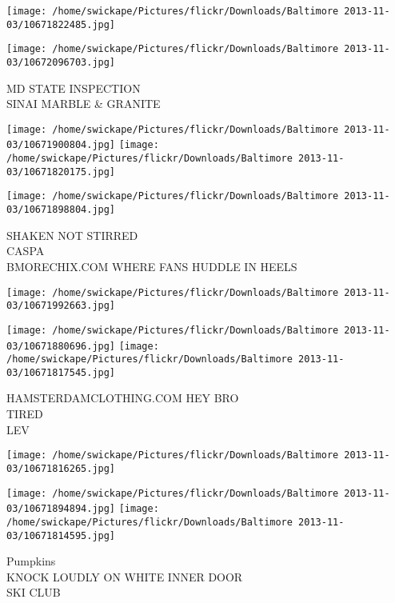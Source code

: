 \documentclass[10pt,letterpaper]{article}
\begin{document}
\texttt{[image: /home/swickape/Pictures/flickr/Downloads/Baltimore 2013-11-03/10671822485.jpg]}

\vspace{0.25in}
\texttt{[image: /home/swickape/Pictures/flickr/Downloads/Baltimore 2013-11-03/10672096703.jpg]}

MD STATE INSPECTION\\
SINAI MARBLE \& GRANITE\\
\pagebreak

\texttt{[image: /home/swickape/Pictures/flickr/Downloads/Baltimore 2013-11-03/10671900804.jpg]}
\texttt{[image: /home/swickape/Pictures/flickr/Downloads/Baltimore 2013-11-03/10671820175.jpg]}

\texttt{[image: /home/swickape/Pictures/flickr/Downloads/Baltimore 2013-11-03/10671898804.jpg]}

SHAKEN NOT STIRRED\\
CASPA\\
BMORECHIX.COM WHERE FANS HUDDLE IN HEELS\\
\pagebreak

\texttt{[image: /home/swickape/Pictures/flickr/Downloads/Baltimore 2013-11-03/10671992663.jpg]}

\vspace{0.25in}
\texttt{[image: /home/swickape/Pictures/flickr/Downloads/Baltimore 2013-11-03/10671880696.jpg]}
\texttt{[image: /home/swickape/Pictures/flickr/Downloads/Baltimore 2013-11-03/10671817545.jpg]}

HAMSTERDAMCLOTHING.COM HEY BRO\\
TIRED\\
LEV\\
\pagebreak

\texttt{[image: /home/swickape/Pictures/flickr/Downloads/Baltimore 2013-11-03/10671816265.jpg]}

\vspace{0.25in}
\texttt{[image: /home/swickape/Pictures/flickr/Downloads/Baltimore 2013-11-03/10671894894.jpg]}
\texttt{[image: /home/swickape/Pictures/flickr/Downloads/Baltimore 2013-11-03/10671814595.jpg]}

Pumpkins\\
KNOCK LOUDLY ON WHITE INNER DOOR\\
SKI CLUB\\
\pagebreak
\end{document}
